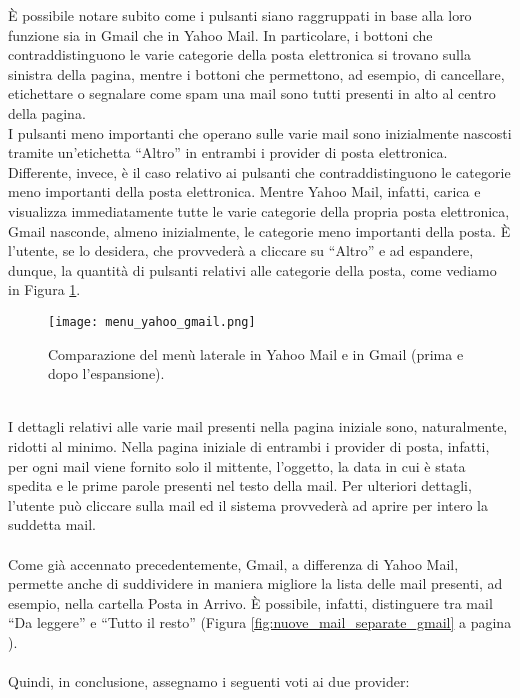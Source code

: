 		È possibile notare subito come i pulsanti siano raggruppati in base alla loro funzione sia in Gmail che in Yahoo Mail. In particolare, i bottoni che contraddistinguono le varie categorie della posta elettronica si trovano sulla sinistra della pagina, mentre i bottoni che permettono, ad esempio, di cancellare, etichettare o segnalare come spam una mail sono tutti presenti in alto al centro della pagina.\\
		I pulsanti meno importanti che operano sulle varie mail sono inizialmente nascosti tramite un'etichetta ``Altro'' in entrambi i provider di posta elettronica.\\
		Differente, invece, è il caso relativo ai pulsanti che contraddistinguono le categorie meno importanti della posta elettronica. Mentre Yahoo Mail, infatti, carica e visualizza immediatamente tutte le varie categorie della propria posta elettronica, Gmail nasconde, almeno inizialmente, le categorie meno importanti della posta. È l'utente, se lo desidera, che provvederà a cliccare su ``Altro'' e ad espandere, dunque, la quantità di pulsanti relativi alle categorie della posta, come vediamo in Figura \ref{fig:menu_yahoo_gmail}.
		\begin{figure}[h!]
			\begin{center}
				\texttt{[image: menu\_yahoo\_gmail.png]}
			\end{center}
			\caption[Menù laterale in Yahoo Mail e Gmail]{Comparazione del menù laterale in Yahoo Mail e in Gmail (prima e dopo l'espansione).}
			\label{fig:menu_yahoo_gmail}
		\end{figure}
		\\
		
		I dettagli relativi alle varie mail presenti nella pagina iniziale sono, naturalmente, ridotti al minimo. Nella pagina iniziale di entrambi i provider di posta, infatti, per ogni mail viene fornito solo il mittente, l'oggetto, la data in cui è stata spedita e le prime parole presenti nel testo della mail. Per ulteriori dettagli, l'utente può cliccare sulla mail ed il sistema provvederà ad aprire per intero la suddetta mail.\\
		\\
		Come già accennato precedentemente, Gmail, a differenza di Yahoo Mail, permette anche di suddividere in maniera migliore la lista delle mail presenti, ad esempio, nella cartella Posta in Arrivo. È possibile, infatti, distinguere tra mail ``Da leggere'' e ``Tutto il resto'' (Figura \ref{fig:nuove_mail_separate_gmail} a pagina \pageref{fig:nuove_mail_separate_gmail}).\\
		\\
		Quindi, in conclusione, assegnamo i seguenti voti ai due provider:
		
